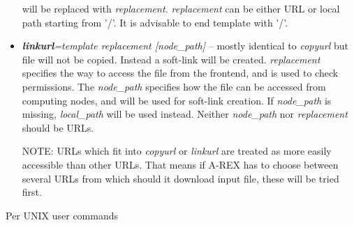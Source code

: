 \documentclass{article}                            %
\begin{document}
\begin{itemize}
will be replaced with \textit{replacement.} \textit{replacement} can
be either URL or local path starting from '/'. It is advisable to
end template with '/'.
\item \textbf{\textit{linkurl}}\textit{=template replacement {[}node\_path]}
-- mostly identical to \textit{copyurl} but file will not be copied. Instead
a soft-link will be created. \textit{replacement} specifies the way
to access the file from the frontend, and is used to check permissions.
The \textit{node\_path} specifies how the file can be accessed from
computing nodes, and will be used for soft-link creation. If \textit{node\_path}
is missing, \textit{local\_path} will be used instead. Neither \textit{node\_path}
nor \textit{replacement} should be URLs.
\begin{framed}
NOTE: URLs which fit into \textit{copyurl} or \textit{linkurl} are
treated as more easily accessible than other URLs. That means if A-REX
has to choose between several URLs from which should it download input
file, these will be tried first.
\end{framed}
\end{itemize}

Per UNIX user commands
\end{document}
